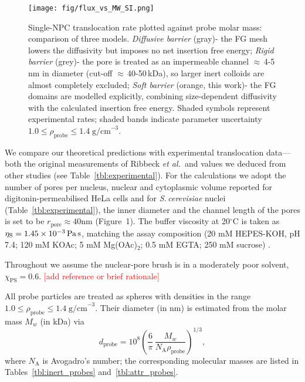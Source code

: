 \documentclass[10pt, a4paper]{article}
\newcommand\todo[1]{\textcolor{red}{#1}}
\begin{document}
\begin{multicols}{2}
\begin{figure}[H]
    \centering
    \texttt{[image: fig/flux\_vs\_MW\_SI.png]}
    \caption{%
    Single-NPC translocation rate plotted against probe molar mass:
    comparison of three models.  
    \textit{Diffusive barrier} (gray)-
    the FG mesh lowers the diffusivity but imposes no net insertion free
    energy;  
    \textit{Rigid barrier} (grey)-
    the pore is treated as an impermeable channel $\approx$\,4-5\,nm in
    diameter (cut-off $\approx$\,40-50\,kDa), so larger inert colloids are almost completely
    excluded;  
    \textit{Soft barrier} (orange, this work)-
    the FG domains are modelled explicitly, combining size-dependent
    diffusivity with the calculated insertion free energy.  
    Shaded symbols represent experimental rates; shaded bands indicate parameter
    uncertainty $1.0 \le \rho_{\text{probe}} \le 1.4\;\text{g/cm}^{-3}$.
    }
    \label{fig:flux_vs_MW}
\end{figure}

We compare our theoretical predictions with experimental translocation data—both the original measurements of Ribbeck \textit{et al.}\,\cite{Ribbeck2001} and values we deduced from other studies \cite{Mohr2009,Popken2015,Timney2016,Frey2018} (see Table~\ref{tbl:experimental}).  
For the calculations we adopt the number of pores per nucleus, nuclear and cytoplasmic volume reported for digitonin-permeabilised HeLa cells \cite{Ribbeck2001} and for \textit{S.\,cerevisiae} nuclei \cite{Timney2016} (Table~\ref{tbl:experimental}), the inner diameter and the channel length of the pores is set to be $r_{\text{pore}}\approx 40 \text{nm}$ (Figure~1).
The buffer viscosity at 20$^\circ$C is taken as $\eta_{\text{S}} = 1.45\times10^{-3}\,\text{Pa\,s}$, matching the assay composition (20 mM HEPES-KOH, pH 7.4; 120 mM KOAc; 5 mM Mg(OAc)$_2$; 0.5 mM EGTA; 250 mM sucrose) \cite{Ribbeck2001}.

Throughout we assume the nuclear-pore brush is in a moderately poor solvent, $\chi_{\text{PS}} = 0.6$. \todo{[add reference or brief rationale]}

All probe particles are treated as spheres with densities in the range $1.0 \le \rho_{\text{probe}} \le 1.4\;\text{g/cm}^{-3}$.  Their
diameter (in nm) is estimated from the molar mass $M_{w}$ (in kDa) via
\begin{equation}
  d_{\text{probe}}
  = 10^{8}
    \left(
      \frac{6}{\pi}\,
      \frac{M_{w}}{N_{\text{A}}\rho_{\text{probe}}}
    \right)^{\!1/3},
  \label{eq:d_probe}
\end{equation}
where $N_{\text{A}}$ is Avogadro's number; the corresponding molecular masses are listed in Tables~\ref{tbl:inert_probes} and~\ref{tbl:attr_probes}.


\end{multicols}
\end{document}
